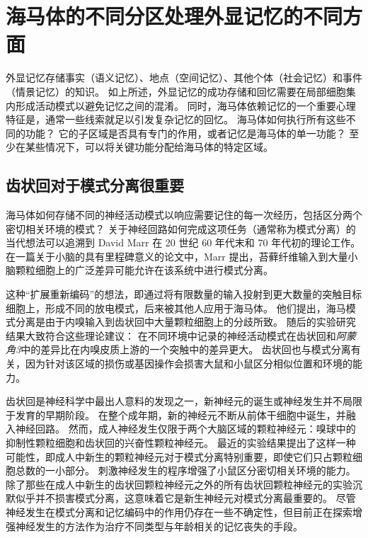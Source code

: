 \section{海马体的不同分区处理外显记忆的不同方面}

外显记忆存储事实（语义记忆）、地点（空间记忆）、其他个体（社会记忆）和事件（情景记忆）的知识。
如上所述，外显记忆的成功存储和回忆需要在局部细胞集内形成活动模式以避免记忆之间的混淆。
同时，海马体依赖记忆的一个重要心理特征是，通常一些线索就足以引发复杂记忆的回忆。
海马体如何执行所有这些不同的功能？
它的子区域是否具有专门的作用，或者记忆是海马体的单一功能？
至少在某些情况下，可以将关键功能分配给海马体的特定区域。



\subsection{齿状回对于模式分离很重要}

海马体如何存储不同的神经活动模式以响应需要记住的每一次经历，包括区分两个密切相关环境的模式？
关于神经回路如何完成这项任务（通常称为模式分离）的当代想法可以追溯到 David Marr 在 20 世纪 60 年代末和 70 年代初的理论工作。
在一篇关于小脑的具有里程碑意义的论文中，Marr 提出，苔藓纤维输入到大量小脑颗粒细胞上的广泛差异可能允许在该系统中进行模式分离。


这种“扩展重新编码”的想法，即通过将有限数量的输入投射到更大数量的突触目标细胞上，形成不同的放电模式，后来被其他人应用于海马体。
他们提出，海马模式分离是由于内嗅输入到齿状回中大量颗粒细胞上的分歧所致。 随后的实验研究结果大致符合这些理论建议：
在不同环境中记录的神经活动模式在齿状回和\textit{阿蒙角3}中的差异比在内嗅皮质上游的一个突触中的差异更大。
齿状回也与模式分离有关，因为针对该区域的损伤或基因操作会损害大鼠和小鼠区分相似位置和环境的能力。


齿状回是神经科学中最出人意料的发现之一，新神经元的诞生或神经发生并不局限于发育的早期阶段。
在整个成年期，新的神经元不断从前体干细胞中诞生，并融入神经回路。
然而，成人神经发生仅限于两个大脑区域的颗粒神经元：嗅球中的抑制性颗粒细胞和齿状回的兴奋性颗粒神经元。 最近的实验结果提出了这样一种可能性，即成人中新生的颗粒神经元对于模式分离特别重要，即使它们只占颗粒细胞总数的一小部分。
刺激神经发生的程序增强了小鼠区分密切相关环境的能力。
除了那些在成人中新生的齿状回颗粒神经元之外的所有齿状回颗粒神经元的实验沉默似乎并不损害模式分离，这意味着它是新生神经元对模式分离最重要的。
尽管神经发生在模式分离和记忆编码中的作用仍存在一些不确定性，但目前正在探索增强神经发生的方法作为治疗不同类型与年龄相关的记忆丧失的手段。



